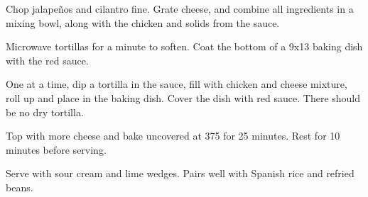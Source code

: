 \begin{recipe}
Chop jalapeños and cilantro fine. Grate cheese, and combine all ingredients in a mixing bowl, along with the chicken and solids from the sauce. 


Microwave tortillas for a minute to soften. Coat the bottom of a 9x13 baking dish with the red sauce.

One at a time, dip a tortilla in the sauce, fill with chicken and cheese mixture, roll up and place in the baking dish. Cover the dish with red sauce. There should be no dry tortilla.

Top with more cheese and bake uncovered at 375\degree{} for 25 minutes. Rest for 10 minutes before serving.

Serve with sour cream and lime wedges. Pairs well with Spanish rice and refried beans.

\end{recipe}
